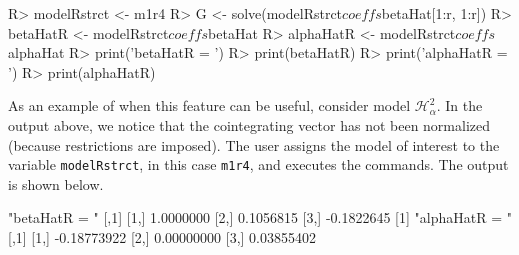 \documentclass[article]{jss}
\begin{document}
\begin{CodeChunk} 
\begin{CodeInput}
R> modelRstrct <- m1r4
R> G <- solve(modelRstrct$coeffs$betaHat[1:r, 1:r])
R> betaHatR <- modelRstrct$coeffs$betaHat %
R> alphaHatR <- modelRstrct$coeffs$alphaHat %
R> print('betaHatR = ')
R> print(betaHatR)
R> print('alphaHatR = ')
R> print(alphaHatR)
\end{CodeInput}
\end{CodeChunk}  


As an example of when this feature can be useful, consider model $\mathscr{H}_{\alpha}^2$. In the output above, we notice that the cointegrating vector has not been normalized (because restrictions are imposed). The user assigns the model of interest to the variable \verb|modelRstrct|, in this case \verb|m1r4|, and executes the commands. The output is shown below.

\begin{CodeChunk} 
\begin{CodeOutput}
[1] "betaHatR = "
           [,1]
[1,]  1.0000000
[2,]  0.1056815
[3,] -0.1822645
[1] "alphaHatR = "
            [,1]
[1,] -0.18773922
[2,]  0.00000000
[3,]  0.03855402
\end{CodeOutput}
\end{CodeChunk}  



\end{document}
